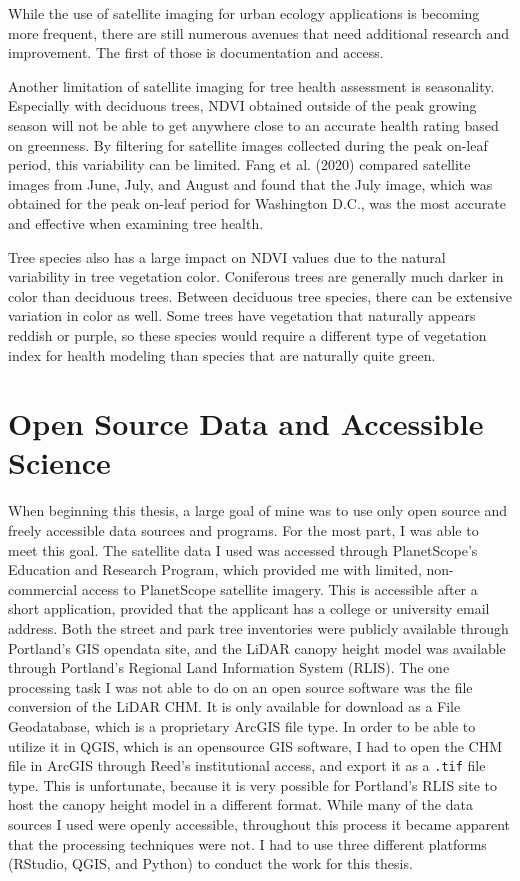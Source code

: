 \documentclass[12pt,twoside]{reedthesis}
\begin{document}
While the use of satellite imaging for urban ecology applications is
becoming more frequent, there are still numerous avenues that need
additional research and improvement. The first of those is documentation
and access.

Another limitation of satellite imaging for tree health assessment is
seasonality. Especially with deciduous trees, NDVI obtained outside of
the peak growing season will not be able to get anywhere close to an
accurate health rating based on greenness. By filtering for satellite
images collected during the peak on-leaf period, this variability can be
limited. Fang et al. (2020) compared satellite images from June, July, and August
and found that the July image, which was obtained for the peak on-leaf
period for Washington D.C., was the most accurate and effective when
examining tree health.

Tree species also has a large impact on NDVI values due to the natural
variability in tree vegetation color. Coniferous trees are generally
much darker in color than deciduous trees. Between deciduous tree
species, there can be extensive variation in color as well. Some trees
have vegetation that naturally appears reddish or purple, so these
species would require a different type of vegetation index for health
modeling than species that are naturally quite green.

\hypertarget{open-source-data-and-accessible-science}{%
\section{Open Source Data and Accessible Science}\label{open-source-data-and-accessible-science}}

When beginning this thesis, a large goal of mine was to use only open
source and freely accessible data sources and programs. For the most
part, I was able to meet this goal. The satellite data I used was
accessed through PlanetScope's Education and Research Program, which
provided me with limited, non-commercial access to PlanetScope satellite
imagery. This is accessible after a short application, provided that the
applicant has a college or university email address. Both the street and
park tree inventories were publicly available through Portland's GIS
opendata site, and the LiDAR canopy height model was available through
Portland's Regional Land Information System (RLIS). The one processing
task I was not able to do on an open source software was the file
conversion of the LiDAR CHM. It is only available for download as a File
Geodatabase, which is a proprietary ArcGIS file type. In order to be
able to utilize it in QGIS, which is an opensource GIS software, I had
to open the CHM file in ArcGIS through Reed's institutional access, and
export it as a \texttt{.tif} file type. This is unfortunate, because it is very
possible for Portland's RLIS site to host the canopy height model in a
different format. While many of the data sources I used were openly
accessible, throughout this process it became apparent that the
processing techniques were not. I had to use three different platforms
(RStudio, QGIS, and Python) to conduct the work for this thesis.
\end{document}
